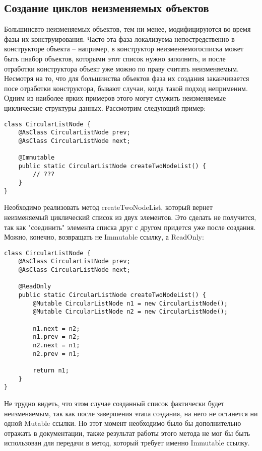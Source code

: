 \subsection{Создание циклов неизменяемых объектов}

Большинсвто неизменяемых объектов, тем ни менее, модифицируются во время фазы их конструирования. Часто эта фаза локализуема непостредственно в конструкторе объекта -- например, в конструктор неизменяемогосписка может быть пнабор объектов, которыми этот список нужно заполнить, и после отработки конструктора объект уже можно по праву считать неизменяемым. Несмотря на то, что для большинства объектов фаза их создания заканчивается посе отработки конструктора, бывают случаи, когда такой подход неприменим. Одним из наиболее ярких примеров этого могут служить неизменяемые циклические структуры данных. Рассмотрим следующий пример:

\begin{lstlisting}[caption=CircularListNode.java, label=code:circular_list_node]
class CircularListNode {
    @AsClass CircularListNode prev;
    @AsClass CircularListNode next;
    
    @Immutable
    public static CircularListNode createTwoNodeList() {
    	// ???
    }
}
\end{lstlisting} 

Необходимо реализовать метод createTwoNodeList, который вернет неизменяемый циклический список из двух элементов. Это сделать не получится, так как "соединить" элемента списка друг с другом придется уже после создания. Можно, конечно, возвращать не Immutable ссылку, а ReadOnly:
 
\begin{lstlisting}[caption=CircularListNode.java, label=code:circular_list_node_ro]
class CircularListNode {
    @AsClass CircularListNode prev;
    @AsClass CircularListNode next;
    
    @ReadOnly
    public static CircularListNode createTwoNodeList() {
    	@Mutable CircularListNode n1 = new CircularListNode();
        @Mutable CircularListNode n2 = new CircularListNode();
    	
        n1.next = n2;
        n1.prev = n2;
        n2.next = n1;
        n2.prev = n1;
    
        return n1;  
    }
}
\end{lstlisting} 

Не трудно видеть, что этом случае созданный список фактически будет неизменяемым, так как после завершения этапа создания, на него не останется ни одной Mutable ссылки. Но этот момент необходимо было бы дополнительно отражать в документации, также результат работы этого метода не мог бы быть использован для передачи в метод, который требует именно Immutable ссылку. 

